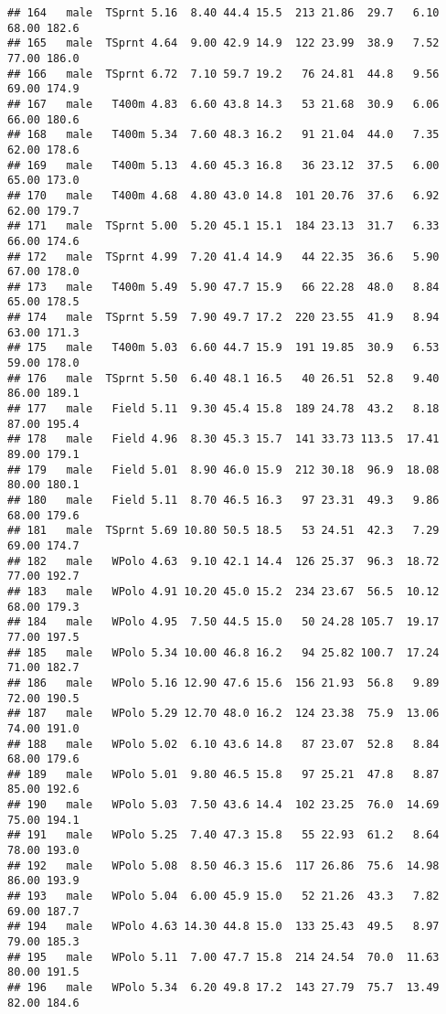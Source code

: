 \documentclass[
]{article}
\begin{document}
\begin{verbatim}
## 164   male  TSprnt 5.16  8.40 44.4 15.5  213 21.86  29.7   6.10  68.00 182.6
## 165   male  TSprnt 4.64  9.00 42.9 14.9  122 23.99  38.9   7.52  77.00 186.0
## 166   male  TSprnt 6.72  7.10 59.7 19.2   76 24.81  44.8   9.56  69.00 174.9
## 167   male   T400m 4.83  6.60 43.8 14.3   53 21.68  30.9   6.06  66.00 180.6
## 168   male   T400m 5.34  7.60 48.3 16.2   91 21.04  44.0   7.35  62.00 178.6
## 169   male   T400m 5.13  4.60 45.3 16.8   36 23.12  37.5   6.00  65.00 173.0
## 170   male   T400m 4.68  4.80 43.0 14.8  101 20.76  37.6   6.92  62.00 179.7
## 171   male  TSprnt 5.00  5.20 45.1 15.1  184 23.13  31.7   6.33  66.00 174.6
## 172   male  TSprnt 4.99  7.20 41.4 14.9   44 22.35  36.6   5.90  67.00 178.0
## 173   male   T400m 5.49  5.90 47.7 15.9   66 22.28  48.0   8.84  65.00 178.5
## 174   male  TSprnt 5.59  7.90 49.7 17.2  220 23.55  41.9   8.94  63.00 171.3
## 175   male   T400m 5.03  6.60 44.7 15.9  191 19.85  30.9   6.53  59.00 178.0
## 176   male  TSprnt 5.50  6.40 48.1 16.5   40 26.51  52.8   9.40  86.00 189.1
## 177   male   Field 5.11  9.30 45.4 15.8  189 24.78  43.2   8.18  87.00 195.4
## 178   male   Field 4.96  8.30 45.3 15.7  141 33.73 113.5  17.41  89.00 179.1
## 179   male   Field 5.01  8.90 46.0 15.9  212 30.18  96.9  18.08  80.00 180.1
## 180   male   Field 5.11  8.70 46.5 16.3   97 23.31  49.3   9.86  68.00 179.6
## 181   male  TSprnt 5.69 10.80 50.5 18.5   53 24.51  42.3   7.29  69.00 174.7
## 182   male   WPolo 4.63  9.10 42.1 14.4  126 25.37  96.3  18.72  77.00 192.7
## 183   male   WPolo 4.91 10.20 45.0 15.2  234 23.67  56.5  10.12  68.00 179.3
## 184   male   WPolo 4.95  7.50 44.5 15.0   50 24.28 105.7  19.17  77.00 197.5
## 185   male   WPolo 5.34 10.00 46.8 16.2   94 25.82 100.7  17.24  71.00 182.7
## 186   male   WPolo 5.16 12.90 47.6 15.6  156 21.93  56.8   9.89  72.00 190.5
## 187   male   WPolo 5.29 12.70 48.0 16.2  124 23.38  75.9  13.06  74.00 191.0
## 188   male   WPolo 5.02  6.10 43.6 14.8   87 23.07  52.8   8.84  68.00 179.6
## 189   male   WPolo 5.01  9.80 46.5 15.8   97 25.21  47.8   8.87  85.00 192.6
## 190   male   WPolo 5.03  7.50 43.6 14.4  102 23.25  76.0  14.69  75.00 194.1
## 191   male   WPolo 5.25  7.40 47.3 15.8   55 22.93  61.2   8.64  78.00 193.0
## 192   male   WPolo 5.08  8.50 46.3 15.6  117 26.86  75.6  14.98  86.00 193.9
## 193   male   WPolo 5.04  6.00 45.9 15.0   52 21.26  43.3   7.82  69.00 187.7
## 194   male   WPolo 4.63 14.30 44.8 15.0  133 25.43  49.5   8.97  79.00 185.3
## 195   male   WPolo 5.11  7.00 47.7 15.8  214 24.54  70.0  11.63  80.00 191.5
## 196   male   WPolo 5.34  6.20 49.8 17.2  143 27.79  75.7  13.49  82.00 184.6

\end{verbatim}
\end{document}
